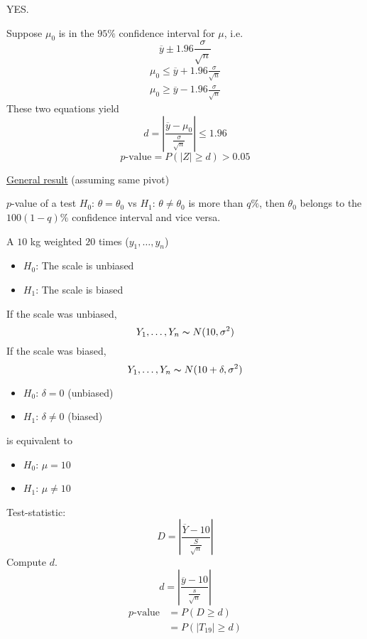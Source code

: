 YES.

Suppose $ \mu_0 $ is in the $ 95\% $ confidence interval for $ \mu $, i.e.
\[ \overline{y}\pm 1.96 \frac{\sigma}{\sqrt{n}} \]
\[ \begin{aligned}
        \mu_0\leqslant \overline{y}+1.96 \frac{\sigma}{\sqrt{n}} \\
        \mu_0\geqslant \overline{y}-1.96 \frac{\sigma}{\sqrt{n}}
    \end{aligned}
\]
These two equations yield
\[ d=\left|\frac{\overline{y}-\mu_0}{\frac{\sigma}{\sqrt{n}}} \right|\leqslant 1.96 \]
\[ p\text{-value}=P(|Z|\geqslant d)>0.05 \]

\underline{General result} (assuming same pivot)

$ p $-value of a test $ H_0 $: $ \theta=\theta_0 $ vs $ H_1 $: $ \theta\neq \theta_0 $
is more than $ q\% $, then $ \theta_0 $ belongs to the $ 100(1-q)\% $
confidence interval and vice versa.

\begin{exbox}
    \begin{example}[Bias]
        A $ 10 $ kg weighted $ 20 $ times ($ y_1,\ldots ,y_n $)
        \begin{itemize}
            \item $ H_0 $: The scale is unbiased
            \item $ H_1 $: The scale is biased
        \end{itemize}
        If the scale was unbiased,
        \[ Y_1,\ldots ,Y_n \thicksim N(10,\sigma^2) \]
        If the scale was biased,
        \[ Y_1,\ldots ,Y_n \thicksim N(10+\delta,\sigma^2) \]
        \begin{itemize}
            \item $ H_0 $: $ \delta=0 $ (unbiased)
            \item $ H_1 $: $ \delta\neq 0 $ (biased)
        \end{itemize}
        is equivalent to
        \begin{itemize}
            \item $ H_0 $: $ \mu=10 $
            \item $ H_1 $: $ \mu\neq 10 $
        \end{itemize}
        Test-statistic:
        \[ D=\left|\frac{\overline{Y}-10}{\frac{S}{\sqrt{n}}} \right| \]
        Compute $ d $.
        \[ d=
            \left|\frac{\overline{y}-10}{\frac{s}{\sqrt{n}}} \right| \]
        \[
            \begin{aligned}
                p\text{-value}
                 & =P(D\geqslant d)        \\
                 & =P(|T_{19}|\geqslant d)
            \end{aligned}
        \]
    \end{example}
\end{exbox}

